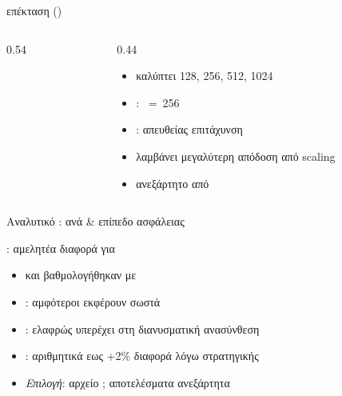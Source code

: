 \begin{frame}{\VLEN επέκταση ()}
  \begin{columns}[T]
    \begin{column}{0.54\textwidth}
      \centering
      \resizebox{\columnwidth}{!}{%
      }
    \end{column}
    \begin{column}{0.44\textwidth}
      \begin{itemize}
        \item \VLEN καλύπτει {128, 256, 512, 1024}
        \item {}: \VLEN~=~256
        \item {}: απευθείας επιτάχυνση \polymul
        \item {} λαμβάνει μεγαλύτερη απόδοση από \VLEN scaling
        \item {} ανεξάρτητο από \VLEN
      \end{itemize}
    \end{column}
  \end{columns}
\end{frame}

\begin{frame}{Αναλυτικό : \instret ανά  \& επίπεδο ασφάλειας}
  \centering
  \resizebox{0.88\textwidth}{!}{%
  }
\end{frame}

\begin{frame}{: αμελητέα διαφορά για }
  \begin{itemize}
    \item {} και  βαθμολογήθηκαν με 
    \item {} : αμφότεροι εκφέρουν \clmul σωστά
    \item {}:  ελαφρώς υπερέχει στη διανυσματική ανασύνθεση
    \item {}: αριθμητικά εως +2\% διαφορά λόγω  στρατηγικής
    \item \emph{Επιλογή}:  αρχείο ; αποτελέσματα ανεξάρτητα 
  \end{itemize}
\end{frame}

